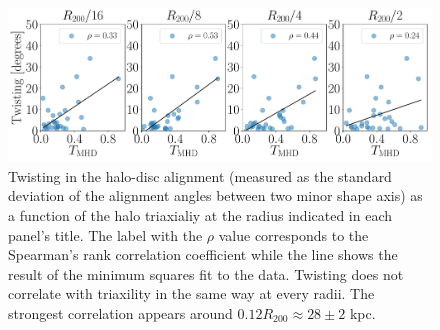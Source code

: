 \documentclass[usenatbib]{mnras}
\begin{document}
\begin{figure}
\begin{center}
\includegraphics[width=1.0\textwidth]{correlations_twisting_triaxiality_MHD.pdf}
\end{center}
\caption{Twisting in the halo-disc alignment (measured as the standard deviation
  of the alignment angles between two minor shape axis)
  as a function of the halo triaxialiy at the radius indicated
  in each panel's title.
  The label with the $\rho$ value corresponds to the Spearman's rank
  correlation coefficient while the line shows the result of the
  minimum squares fit to the data.
  Twisting does not correlate with triaxility in the same way at every
  radii. The strongest correlation appears around $0.12R_{200}\approx
  28\pm2$ kpc.} 
\label{fig:alignment_correlations}
\end{figure}
\end{document}
